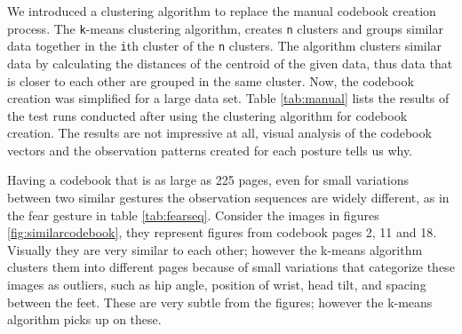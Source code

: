\documentclass[]{report}   %
\begin{document}
We introduced a clustering algorithm to replace the manual codebook creation process. The \texttt{k}-means clustering algorithm, creates \texttt{n} clusters and groups similar data together in the \texttt{i}th cluster of the \texttt{n} clusters. The algorithm clusters similar data by calculating the distances of the centroid of the given data, thus data that is closer to each other are grouped in the same cluster. Now, the codebook creation was simplified for a large data set. Table \ref{tab:manual} lists the results of the test runs conducted after using the clustering algorithm for codebook creation. The results are not impressive at all, visual analysis of the codebook vectors and the observation patterns created for each posture tells us why. 

Having a codebook that is as large as 225 pages, even for small variations between two similar gestures the observation sequences are widely different, as in the fear gesture in table \ref{tab:fearseq}. Consider the images in figures \ref{fig:similarcodebook}, they represent figures from codebook pages 2, 11 and 18. Visually they are very similar to each other; however the k-means algorithm clusters them into different pages because of small variations that categorize these images as outliers, such as hip angle, position of wrist, head tilt, and spacing between the feet. These are very subtle from the figures; however the k-means algorithm picks up on these. 
\end{document}
